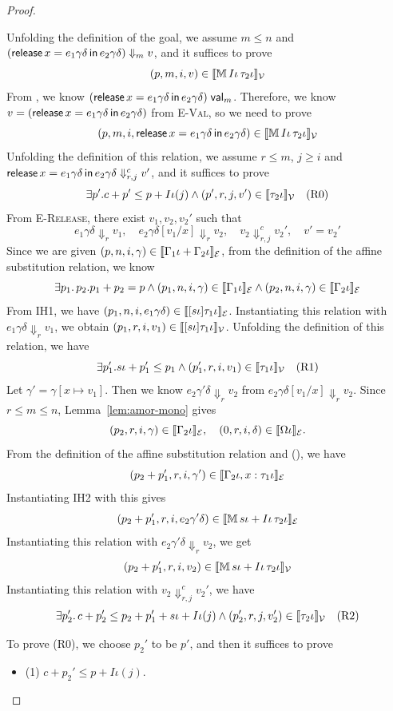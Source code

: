 \begin{proof}
\begin{itemize}
Unfolding the definition of the goal, we assume $m\leq n$ and $(\mathsf{release}\, x = e_1\gamma\delta \, \mathsf{in}\, e_2\gamma\delta) \Downarrow_m v$, and it suffices to prove
\[(p, m, i, v) \in \llbracket \mathbb{M}\,{I\iota}\, \tau_2 \iota \rrbracket_{\mathcal{V}} \]
From , we know $(\mathsf{release}\, x = e_1\gamma\delta \, \mathsf{in}\, e_2\gamma\delta)\;\mathsf{val}_{m}$.
Therefore, we know $v= (\mathsf{release}\, x = e_1\gamma\delta \, \mathsf{in}\, e_2\gamma\delta)$ from \textsc{E-Val}, so we need to prove 
\[
(p, m, i, \mathsf{release}\, x = e_1\gamma\delta \, \mathsf{in}\, e_2\gamma\delta) \in \llbracket \mathbb{M}\,{I\iota}\, \tau_2\iota \rrbracket_{\mathcal{V}}
\]
Unfolding the definition of this relation, we assume $r \leq m$, $j\ge i$ and $\mathsf{release}\, x = e_1\gamma\delta \, \mathsf{in}\, e_2\gamma\delta \Downarrow^{c}_{r, j} v'$, and it suffices to prove
\[\exists p'. c+p' \leq p+I\iota(j) \land (p', r, j, v') \in \llbracket {\tau_2\iota} \rrbracket_{\mathcal{V}} \quad (\text{R0})\]
From \textsc{E-Release}, there exist $v_1, v_2, v_2'$ such that 
\[e_1\gamma\delta \Downarrow_r v_1, \quad e_2\gamma\delta[v_1/x] \Downarrow_r v_2, \quad v_2 \Downarrow^c_{r,j} v_2',
\quad v' = v_2'\]
Since we are given $(p,n,i, \gamma) \in \llbracket \Gamma_1\iota + \Gamma_2\iota \rrbracket_{\mathcal{E}}$, from the definition of the affine substitution relation, we know 
\[ \exists p_1.\, p_2. p_1+p_2 = p \land (p_1,n,i, \gamma) \in \llbracket \Gamma_1\iota \rrbracket_{\mathcal{E}} \land (p_2,n,i, \gamma) \in \llbracket \Gamma_2\iota \rrbracket_{\mathcal{E}}\]
From IH1, we have $(p_1, n, i, e_1\gamma\delta) \in \llbracket [s\iota]\tau_1\iota \rrbracket_{\mathcal{E}}$. Instantiating this relation with $e_1\gamma\delta \Downarrow_r v_1$, we obtain $(p_1,r,i,v_1) \in \llbracket [s\iota]\tau_1\iota \rrbracket_{\mathcal{V}}$.
Unfolding the definition of this relation, we have 
\[\exists p_1'. s\iota + p_1' \leq p_1 \land (p_1', r, i, v_1) \in \llbracket \tau_1\iota \rrbracket_{\mathcal{V}} \quad (\text{R1})\]
Let $\gamma' = \gamma[x\mapsto v_1]$. Then we know $e_2\gamma'\delta \Downarrow_r v_2$ from $e_2\gamma\delta[v_1/x] \Downarrow_r v_2$.
Since $r \leq m \leq n$, Lemma~\ref{lem:amor-mono} gives
\[(p_2, r, i, \gamma)\in\llbracket \Gamma_2\iota \rrbracket_{\mathcal{E}}, \quad (0, r, i, \delta)\in\llbracket \Omega\iota \rrbracket_{\mathcal{E}}.\]
From the definition of the affine substitution relation and (), we have 
\[(p_2+p_1', r, i, \gamma') \in \llbracket \Gamma_2\iota, x:\tau_1\iota \rrbracket_{\mathcal{E}}\]
Instantiating IH2 with this gives
\[(p_2+p_1', r, i, e_2\gamma'\delta) \in \llbracket \mathbb{M}\,{s\iota+I\iota}\, \tau_2\iota \rrbracket_{\mathcal{E}}\]
Instantiating this relation with $e_2\gamma'\delta \Downarrow_r v_2$, we get 
\[(p_2+p_1', r, i, v_2) \in \llbracket \mathbb{M}\,{s\iota+I\iota}\, \tau_2\iota \rrbracket_{\mathcal{V}}\]
Instantiating this relation with $v_2 \Downarrow^c_{r,j} v_2'$, we have 
\[\exists p_2'.\,c+p_2' \leq p_2+p_1'+ s\iota + I\iota(j) \land (p_2', r, j, v_2') \in \llbracket \tau_2\iota \rrbracket_{\mathcal{V}} \quad (\text{R2})\]

To prove (R0), we choose $p_2'$ to be $p'$, and then it suffices to prove 
\begin{itemize}
  \item (1) $c+p_2' \leq p+I\iota(j)$.


\end{itemize}
\end{itemize}
\end{proof}
